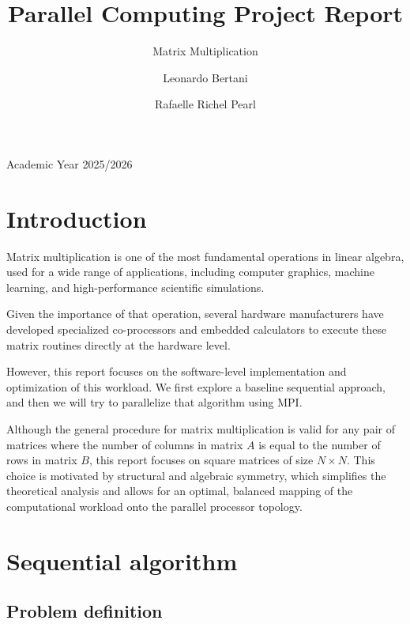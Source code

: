 \documentclass[
  12pt,
]{article}
\title{Parallel Computing Project Report}
\subtitle{Matrix Multiplication}
\author{Leonardo Bertani \and Rafaelle Richel Pearl}
\date{}
\begin{document}
\maketitle


\begin{center}
  Academic Year 2025/2026
  \vspace{1em}
\end{center}

\section{Introduction}\label{introduction}

Matrix multiplication is one of the most fundamental operations in
linear algebra, used for a wide range of applications, including
computer graphics, machine learning, and high-performance scientific
simulations.

Given the importance of that operation, several hardware manufacturers
have developed specialized co-processors and embedded calculators to
execute these matrix routines directly at the hardware level.

However, this report focuses on the software-level implementation and
optimization of this workload. We first explore a baseline sequential
approach, and then we will try to parallelize that algorithm using MPI.

\begin{tcolorbox}[enhanced jigsaw, arc=.35mm, bottomrule=.15mm, breakable, colback=white, colframe=quarto-callout-note-color-frame, left=2mm, leftrule=.75mm, opacityback=0, rightrule=.15mm, toprule=.15mm]

Although the general procedure for matrix multiplication is valid for
any pair of matrices where the number of columns in matrix \(A\) is
equal to the number of rows in matrix \(B\), this report focuses on
square matrices of size \(N \times N\). This choice is motivated by
structural and algebraic symmetry, which simplifies the theoretical
analysis and allows for an optimal, balanced mapping of the
computational workload onto the parallel processor topology.

\end{tcolorbox}

\section{Sequential algorithm}\label{sequential-algorithm}

\subsection{Problem definition}\label{problem-definition}
\end{document}
